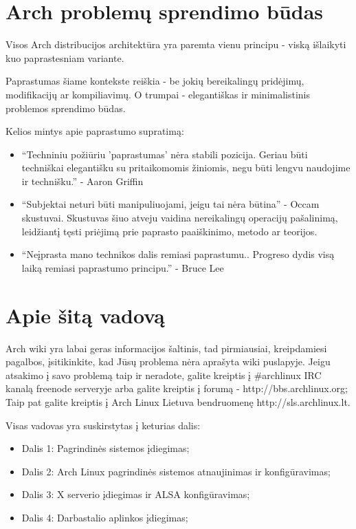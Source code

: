 \documentclass[a4paper]{book}
\begin{document}
  \section{Arch problemų sprendimo būdas}
  
  Visos Arch distribucijos architektūra yra paremta vienu principu -
  viską išlaikyti kuo paprastesniam variante.

  Paprastumas šiame kontekste reiškia - be jokių bereikalingų
  pridėjimų, modifikacijų ar kompiliavimų. O trumpai - elegantiškas
  ir minimalistinis problemos sprendimo būdas.

  Kelios mintys apie paprastumo supratimą:
  \begin{itemize}
    \item ``Techniniu požiūriu 'paprastumas' nėra stabili
      pozicija. Geriau būti techniškai elegantišku su pritaikomomis
      žiniomis, negu būti lengvu naudojime ir technišku.'' - Aaron
      Griffin
    \item ``Subjektai neturi būti manipuliuojami, jeigu tai nėra
      būtina'' - Occam skustuvai. Skustuvas šiuo atveju vaidina
      nereikalingų operacijų pašalinimą, leidžiantį tęsti priėjimą prie
      paprasto paaiškinimo, metodo ar teorijos.
    \item ``Neįprasta mano technikos dalis remiasi
      paprastumu.. Progreso dydis visą laiką remiasi paprastumo principu.'' - Bruce Lee
  \end{itemize}

  \section{Apie šitą vadovą}

    Arch wiki yra labai geras informacijos šaltinis, tad pirmiausiai,
    kreipdamiesi pagalbos, įsitikinkite, kad Jūsų problema nėra
    aprašyta wiki puslapyje. Jeigu atsakimo į savo problemą taip ir neradote, galite
    kreiptis į $\#$archlinux IRC kanalą freenode serveryje arba galite
    kreiptis į forumą - http://bbs.archlinux.org; Taip pat galite
    kreiptis į Arch Linux Lietuva bendruomenę http://sls.archlinux.lt.

    Visas vadovas yra suskirstytas į keturias dalis:
    \begin{itemize}
      \item Dalis 1: Pagrindinės sistemos įdiegimas;
      \item Dalis 2: Arch Linux pagrindinės sistemos atnaujinimas ir
        konfigūravimas;
      \item Dalis 3: X serverio įdiegimas ir ALSA konfigūravimas;
      \item Dalis 4: Darbastalio aplinkos įdiegimas;
    \end{itemize}
\end{document}
